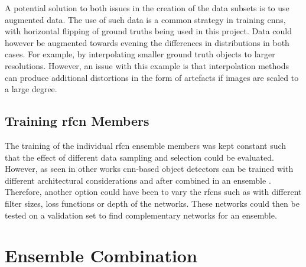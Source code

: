 A potential solution to both issues in the creation of the data subsets is to use augmented data. The use of such data is a common strategy in training \glspl{cnn}, with horizontal flipping of ground truths being used in this project. Data could however be augmented towards evening the differences in distributions in both cases. For example, by interpolating smaller ground truth objects to larger resolutions. However, an issue with this example is that interpolation methods can produce additional distortions in the form of artefacts if images are scaled to a large degree.

\subsection{Training \gls{rfcn} Members}
The training of the individual \gls{rfcn} ensemble members was kept constant such that the effect of different data sampling and selection could be evaluated. However, as seen in other works \gls{cnn}-based object detectors can be trained with different architectural considerations and after combined in an ensemble \cite{deepres}. Therefore, another option could have been to vary the \glspl{rfcn} such as with different filter sizes, loss functions or depth of the networks. These networks could then be tested on a validation set to find complementary networks for an ensemble.

\section{Ensemble Combination}